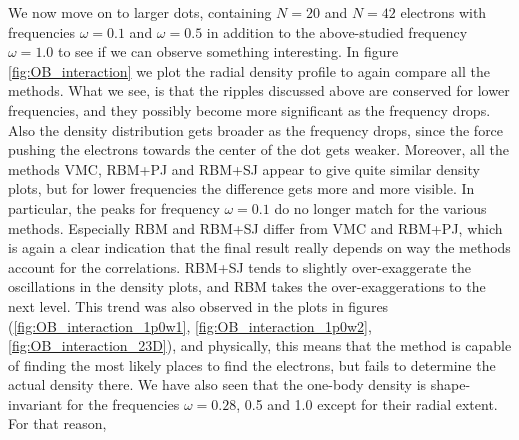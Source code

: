 We now move on to larger dots, containing $N=20$ and $N=42$ electrons with frequencies $\omega=0.1$ and $\omega=0.5$ in addition to the above-studied frequency $\omega=1.0$ to see if we can observe something interesting. In figure \eqref{fig:OB_interaction} we plot the radial density profile to again compare all the methods. What we see, is that the ripples discussed above are conserved for lower frequencies, and they possibly become more significant as the frequency drops. Also the density distribution gets broader as the frequency drops, since the force pushing the electrons towards the center of the dot gets weaker. Moreover, all the methods VMC, RBM+PJ and RBM+SJ appear to give quite similar density plots, but for lower frequencies the difference gets more and more visible. In particular, the peaks for frequency $\omega=0.1$ do no longer match for the various methods. Especially RBM and RBM+SJ differ from VMC and RBM+PJ, which is again a clear indication that the final result really depends on way the methods account for the correlations. RBM+SJ tends to slightly over-exaggerate the oscillations in the density plots, and RBM takes the over-exaggerations to the next level. This trend was also observed in the plots in figures (\ref{fig:OB_interaction_1p0w1}, \ref{fig:OB_interaction_1p0w2}, \ref{fig:OB_interaction_23D}), and physically, this means that the method is capable of finding the most likely places to find the electrons, but fails to determine the actual density there. We have also seen that the one-body density is shape-invariant for the frequencies $\omega=0.28$, 0.5 and 1.0 except for their radial extent. For that reason, 

